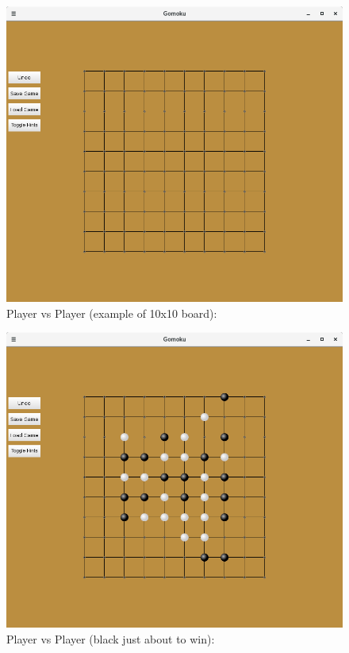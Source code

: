 \documentclass[11]{article}
\begin{document}
\begin{figure}[h]
					\caption{Player vs Player (example of 10x10 board):}				\centering
					\includegraphics[scale=0.5]{pvp1.png}
\end{figure}

\begin{figure}[h]
					\caption{Player vs Player (black just about to win):}				\centering
					\includegraphics[scale=0.5]{pvp2.png}
\end{figure}
\end{document}

